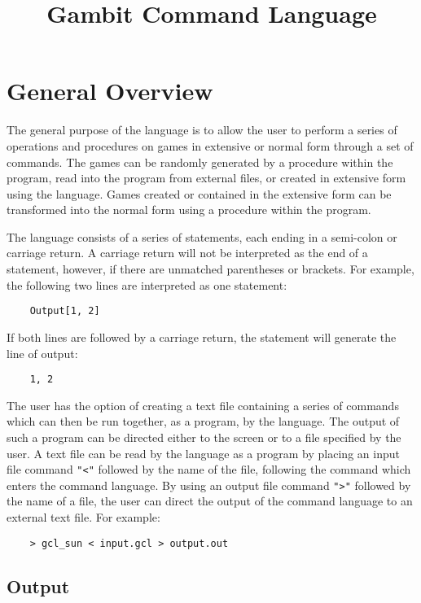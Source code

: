 

\title{Gambit Command Language}

\section*{General Overview}

The general purpose of the language is to allow the user to perform a series of
operations and procedures on games in extensive or normal form through a set of
commands.  The games can be randomly generated by a procedure within the
program, read into the program from external files, or created in extensive
form using the language.  Games created or contained in the extensive form can
be transformed into the normal form using a procedure within the program.

The language consists of a series of statements, each ending in a semi-colon
or carriage return.  A carriage return will not be interpreted as the end of a
statement, however, if there are unmatched parentheses or brackets.  For
example, the following two lines are interpreted as one statement:

\begin{verbatim}
	Output[1, 2]
\end{verbatim}

If both lines are followed by a carriage return, the statement will generate
the line of output: 

\begin{verbatim}
	1, 2
\end{verbatim}

The user has the option of creating a text file containing a series of commands
which can then be run together, as a program, by the language.  The output of 
such a program can be directed either to the screen or to a file specified by 
the user.  A text file can be read by the language as a program by placing an 
input file command {\tt "<"} followed by the name of the file, following the 
command which enters the command language.  By using an output file command 
{\tt ">"} followed by the name of a file, the user can direct the output of 
the command language to an external text file.  For example:

\begin{verbatim}
	> gcl_sun < input.gcl > output.out
\end{verbatim}

\subsection*{Output}

